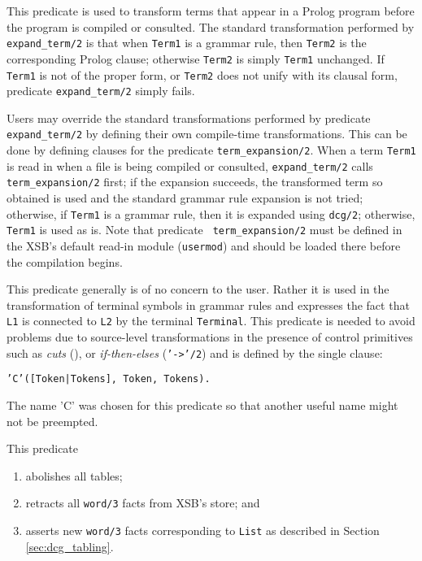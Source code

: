 \begin{description}
    This predicate is used to transform terms that appear in a Prolog program
    before the program is compiled or consulted.
    The standard transformation performed by {\tt expand\_term/2} is that 
    when {\tt Term1} is a grammar rule, then {\tt Term2} is the corresponding
    Prolog clause; otherwise {\tt Term2} is simply {\tt Term1} unchanged. If
    {\tt Term1} is not of the proper form, or {\tt Term2} does not unify with
    its clausal form, predicate {\tt expand\_term/2} simply fails.

    Users may override the standard transformations performed by predicate
    {\tt expand\_term/2} by defining their own compile-time transformations.
    This can be done by defining clauses for the predicate
    {\tt term\_expansion/2}.
    When a term {\tt Term1} is read in when a file is being compiled or 
    consulted, {\tt expand\_term/2} calls {\tt term\_expansion/2} first;
    if the expansion succeeds, the transformed term so obtained is used and 
    the standard grammar rule expansion is not tried; otherwise, if 
    {\tt Term1} is a grammar rule, then it is expanded using {\tt dcg/2}; 
    otherwise, {\tt Term1} is used as is.  Note that predicate {\tt
    term\_expansion/2} must be defined in the XSB's default read-in
    module ({\tt usermod}) and should be loaded there before the compilation
    begins.

This predicate generally is of no concern to the user.  Rather it is used 
    in the transformation of terminal symbols in 
    grammar rules and expresses the fact that {\tt L1} is connected 
    to {\tt L2} by the terminal {\tt Terminal}. This predicate is
    needed to avoid problems due to source-level
    transformations in the presence of control primitives such as
    {\em cuts} (\cut), or {\em if-then-elses} 
    ({\tt '->'/2}) and is defined by the single clause:
    \begin{center}
                {\tt 'C'([Token|Tokens], Token, Tokens).}
    \end{center}
    The name 'C' was chosen for this predicate so that another useful
    name might not be preempted.

This predicate 

\begin{enumerate}
\item abolishes all tables;
\item retracts all {\tt word/3} facts from XSB's store; and
\item asserts new {\tt word/3} facts corresponding to {\tt List} as
described in Section \ref{sec:dcg_tabling}.
\end{enumerate}


\end{description}
